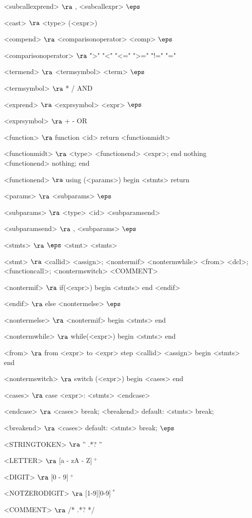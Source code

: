 \begin{grammar}
<subcallexprend> $\ra$ , <subcallexpr>
\alt$\eps$

<cast> $\ra$ <type> (<expr>)

<compend> $\ra$ <comparisonoperator> <comp>
\alt$\eps$

<comparisonoperator> $\ra$ ">"
				\alt "<"
				\alt "<="
				\alt ">="
				\alt "!="
				\alt "="

<termend> $\ra$ <termsymbol> <term>
\alt$\eps$

<termsymbol> $\ra$ *
\alt /
\alt AND 

<exprend> $\ra$ <exprsymbol> <expr>
\alt$\eps$

<exprsymbol> $\ra$ +
\alt -
\alt OR 

<function> $\ra$ function <id> return <functionmidt>

<functionmidt> $\ra$ <type> <functionend> <expr>; end
\alt nothing <functionend> nothing; end

<functionend> $\ra$
using (<params>)
begin
	<stmts>
	return

<params> $\ra$ <subparams>
	\alt$\eps$

<subparams> $\ra$ <type> <id> <subparamsend>

<subparamsend> $\ra$ , <subparams>
\alt$\eps$

<stmts> $\ra$ $\eps$
	\alt <stmt> <stmts>

<stmt> $\ra$ <callid> <assign>;
	\alt <nontermif>
	\alt <nontermwhile>
	\alt <from>
	\alt <dcl>;
	\alt <functioncall>;
	\alt <nontermswitch>
	\alt <COMMENT>
	
<nontermif> $\ra$ if(<expr>)
	begin
		<stmts>
	end
	<endif>

<endif> $\ra$ 
	else <nontermelse>
	\alt$\eps$

<nontermelse> $\ra$ <nontermif>
	\alt begin
		<stmts>
	end

<nontermwhile> $\ra$ while(<expr>)
		begin
			<stmts>
		end
		
<from> $\ra$ from <expr> to <expr> step <callid> <assign>
	begin
		<stmts>
	end

<nontermswitch> $\ra$ switch (<expr>)
		begin
			<cases>
		end

<cases> $\ra$ case <expr>:
			<stmts>
		<endcase>
		
<endcase> $\ra$ <cases>
		\alt break; <breakend>
		\alt default:
			<stmts>
			break;

<breakend> $\ra$ <cases>
\alt default:
<stmts>
break;
\alt$\eps$

<STRINGTOKEN> $\ra$ '' .*? '' 

<LETTER> $\ra$ [a - zA - Z]$~^+$

<DIGIT> $\ra$ [0 - 9]$~^+$

<NOTZERODIGIT> $\ra$ [1-9][0-9]$~^*$

<COMMENT> $\ra$ /* .*? */


\end{grammar}